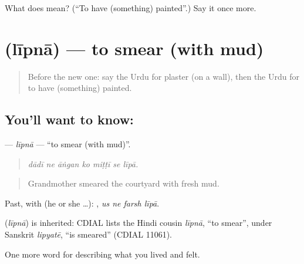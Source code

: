 \begin{tcolorbox}[breakable,colback=teal!4,colframe=teal!35!black,title={Before you move on}]
What does  mean? (\textquotedblleft{}To have (something) painted\textquotedblright{}.) Say it once more.
\end{tcolorbox}
\section[\texorpdfstring{\ur{لیپنا} (līpnā)}{لیپنا (līpnā)}]{ (līpnā) — to smear (with mud)}

\label{lesson:UR-C503-lipna}



\begin{quote}
Before the new one: say the Urdu for plaster (on a wall), then the Urdu for to have (something) painted.
\end{quote}

\subsection*{You'll want to know: }
\textbf{} — \emph{līpnā} — \textquotedblleft{}to smear (with mud)\textquotedblright{}.

\begin{quote}
      
\end{quote}

\begin{quote}
\emph{dādī ne āṅgan ko miṭṭī se līpā.}
\end{quote}

\begin{quote}
Grandmother smeared the courtyard with fresh mud.
\end{quote}

Past, with  (he or she …):    , \emph{us ne farsh līpā}.

\begin{cousinweb}
\textbf{} (\emph{līpnā}) is inherited: CDIAL lists the Hindi cousin \emph{līpnā}, \textquotedblleft{}to smear\textquotedblright{}, under Sanskrit \emph{lipyatē}, \textquotedblleft{}is smeared\textquotedblright{} (CDIAL 11061).
\end{cousinweb}

\begin{grammarlens}[title={What you've built}]
One more word for describing what you lived and felt.
\end{grammarlens}

